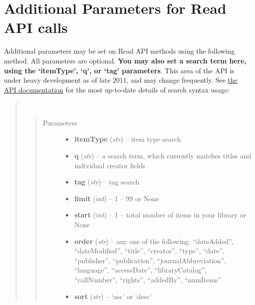 \documentclass[letterpaper,10pt,english]{sphinxmanual}
\begin{document}
\section{Additional Parameters for Read API calls}
\label{index:additional-parameters-for-read-api-calls}
Additional parameters may be set on Read API methods using the following method. All parameters are optional. \textbf{You may also set a search term here, using the `itemType', `q', or `tag' parameters}. This area of the API is under heavy development as of late 2011, and may change frequently. See \href{http://www.zotero.org/support/dev/server\_api/read\_api\#search\_syntax}{the API documentation} for the most up-to-date details of search syntax usage:
\begin{quote}

\begin{fulllineitems}
\label{index:pyzotero.zotero.Zotero.add_parameters}~\begin{quote}\begin{description}
\item[{Parameters}] \leavevmode\begin{itemize}
\item {} 
\textbf{itemType} (\emph{str}) -- item type search

\item {} 
\textbf{q} (\emph{str}) -- a search term, which currently matches titles and individual creator fields

\item {} 
\textbf{tag} (\emph{str}) -- tag search

\item {} 
\textbf{limit} (\emph{int}) -- 1 – 99 or None

\item {} 
\textbf{start} (\emph{int}) -- 1 – total number of items in your library or None

\item {} 
\textbf{order} (\emph{str}) -- any one of the following: “dateAdded”, “dateModified”, “title”, “creator”, “type”, “date”, “publisher”, “publication”, “journalAbbreviation”, “language”, “accessDate”, “libraryCatalog”, “callNumber”, “rights”, “addedBy”, “numItems”

\item {} 
\textbf{sort} (\emph{str}) -- `asc' or `desc'


\end{itemize}
\end{description}
\end{quote}
\end{fulllineitems}
\end{quote}
\end{document}
